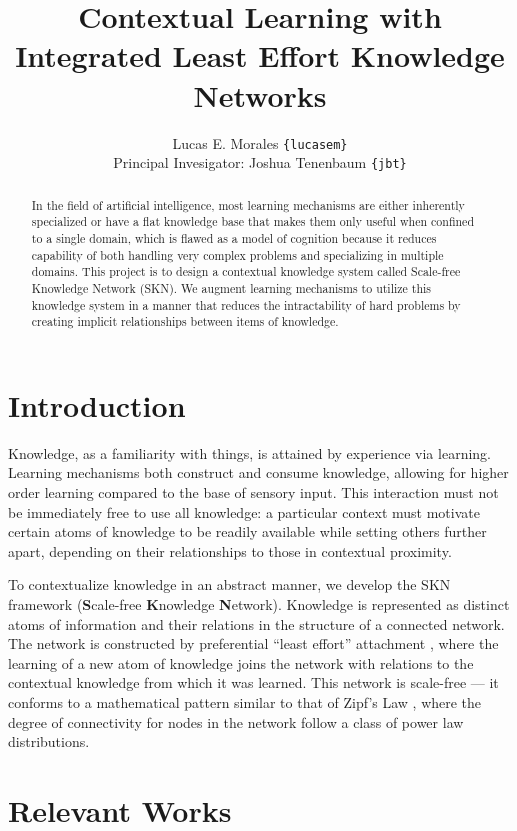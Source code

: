 \documentclass[11pt,letterpaper]{article}
\title{{Contextual Learning with Integrated Least Effort Knowledge Networks}}
\author{Lucas E. Morales \texttt{\{lucasem\}}\\
Principal Invesigator: Joshua Tenenbaum \texttt{\{jbt\}}}
\date{}
\begin{document}
\maketitle

\begin{abstract}
  In the field of artificial intelligence, most learning mechanisms are
  either inherently specialized or have a flat knowledge base that makes
  them only useful when confined to a single domain, which is flawed as a
  model of cognition because it reduces capability of both handling very
  complex problems and specializing in multiple domains. This project is to
  design a contextual knowledge system called Scale-free Knowledge Network
  (SKN). We augment learning mechanisms to utilize this knowledge system in
  a manner that reduces the intractability of hard problems by creating
  implicit relationships between items of knowledge.
\end{abstract}


\section{Introduction}

Knowledge, as a familiarity with things, is attained by experience via
learning. Learning mechanisms both construct and consume knowledge, allowing
for higher order learning compared to the base of sensory input. This
interaction must not be immediately free to use all knowledge: a particular
context must motivate certain atoms of knowledge to be readily available
while setting others further apart, depending on their relationships to
those in contextual proximity.

To contextualize knowledge in an abstract manner, we develop the SKN
framework ({\bf S}cale-free {\bf K}nowledge {\bf N}etwork). Knowledge is
represented as distinct atoms of information and their relations in the
structure of a connected network. The network is constructed by preferential
``least effort'' attachment \cite{barabasi99}\cite{cancho03}, where the
learning of a new atom of knowledge joins the network with relations to the
contextual knowledge from which it was learned. This network is scale-free
--- it conforms to a mathematical pattern similar to that of Zipf's Law
\cite{zipf49}, where the degree of connectivity for nodes in the network
follow a class of power law distributions.


\section{Relevant Works}
\end{document}
